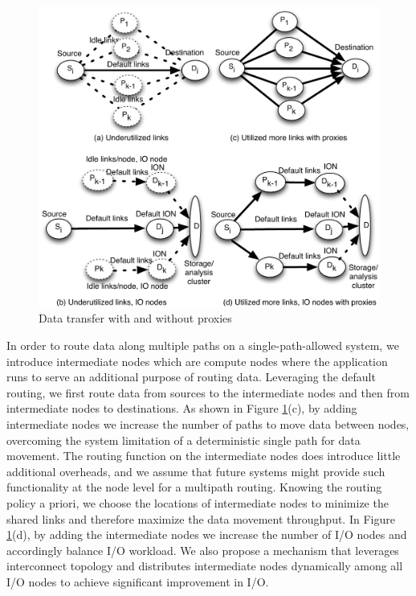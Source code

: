 \begin{figure}[!htb]
\vspace{-0.1in}
\centering
\includegraphics[scale=0.5]{figures/multiply}
\vspace{-0.2in}
\caption{Data transfer with and without proxies}
\vspace{-0.1in}
\label{fig:multiply}
\end{figure}

In order to route data along multiple paths on a single-path-allowed system, we introduce intermediate nodes which are compute nodes where the application runs to serve an additional purpose of routing data. Leveraging the default routing, we first route data from sources to the intermediate nodes and then from intermediate nodes to destinations. As shown in Figure \ref{fig:multiply}(c), by adding intermediate nodes we increase the number of paths to move data between nodes, overcoming the system limitation of a deterministic single path for data movement. The  routing function on the intermediate nodes does introduce little additional overheads, and we assume that future systems might provide such functionality at the node level for a multipath routing.  Knowing the routing policy a priori, we choose the locations of intermediate nodes to minimize the shared links and therefore maximize the data movement throughput. In Figure \ref{fig:multiply}(d), by adding the intermediate nodes we increase the number of I/O nodes and accordingly balance I/O workload. 
We also propose a mechanism that leverages interconnect topology and distributes intermediate nodes dynamically among all I/O nodes to achieve significant improvement in I/O. 

